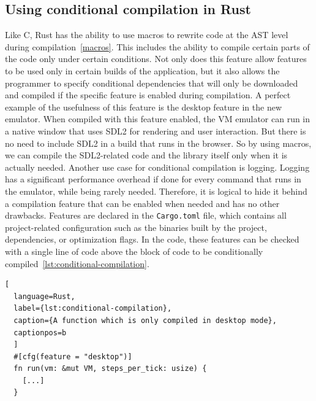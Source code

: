 \subsection{Using conditional compilation in Rust} \label{conditional-compilation}
Like C, Rust has the ability to use macros to rewrite code at the AST level during compilation~\ref{macros}. This includes the ability to compile certain parts of the code only under certain conditions.
Not only does this feature allow features to be used only in certain builds of the application, but it also allows the programmer to specify conditional dependencies that will only be downloaded and compiled if the specific feature is enabled during compilation.
A perfect example of the usefulness of this feature is the desktop feature in the new emulator. When compiled with this feature enabled, the VM emulator can run in a native window that uses SDL2 for rendering and user interaction.
But there is no need to include SDL2 in a build that runs in the browser. So by using macros, we can compile the SDL2-related code and the library itself only when it is actually needed.
Another use case for conditional compilation is logging. Logging has a significant performance overhead if done for every command that runs in the emulator, while being rarely needed. Therefore, it is logical to hide it behind a compilation feature that can be enabled when needed and has no other drawbacks. Features are declared in the \verb+Cargo.toml+ file, which contains all project-related configuration such as the binaries built by the project, dependencies, or optimization flags.
In the code, these features can be checked with a single line of code above the block of code to be conditionally compiled~\ref{lst:conditional-compilation}.

\begin{lstlisting}[
  language=Rust,
  label={lst:conditional-compilation},
  caption={A function which is only compiled in desktop mode},
  captionpos=b
  ]
  #[cfg(feature = "desktop")]
  fn run(vm: &mut VM, steps_per_tick: usize) {
    [...]
  }
\end{lstlisting}

